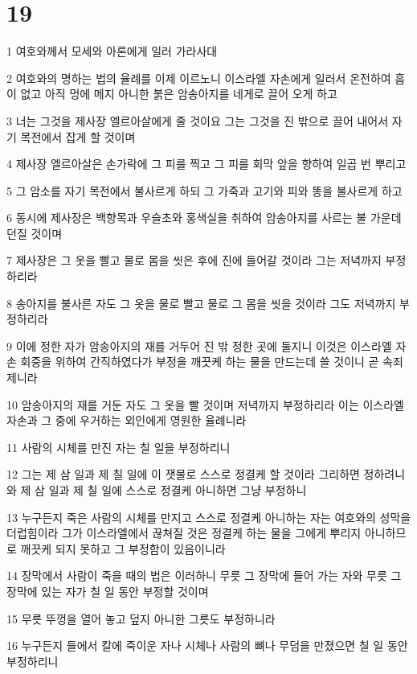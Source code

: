 \chapter{19}

\par 1 여호와께서 모세와 아론에게 일러 가라사대
\par 2 여호와의 명하는 법의 율례를 이제 이르노니 이스라엘 자손에게 일러서 온전하여 흠이 없고 아직 멍에 메지 아니한 붉은 암송아지를 네게로 끌어 오게 하고
\par 3 너는 그것을 제사장 엘르아살에게 줄 것이요 그는 그것을 진 밖으로 끌어 내어서 자기 목전에서 잡게 할 것이며
\par 4 제사장 엘르아살은 손가락에 그 피를 찍고 그 피를 회막 앞을 향하여 일곱 번 뿌리고
\par 5 그 암소를 자기 목전에서 불사르게 하되 그 가죽과 고기와 피와 똥을 불사르게 하고
\par 6 동시에 제사장은 백향목과 우슬초와 홍색실을 취하여 암송아지를 사르는 불 가운데 던질 것이며
\par 7 제사장은 그 옷을 빨고 물로 몸을 씻은 후에 진에 들어갈 것이라 그는 저녁까지 부정하리라
\par 8 송아지를 불사른 자도 그 옷을 물로 빨고 물로 그 몸을 씻을 것이라 그도 저녁까지 부정하리라
\par 9 이에 정한 자가 암송아지의 재를 거두어 진 밖 정한 곳에 둘지니 이것은 이스라엘 자손 회중을 위하여 간직하였다가 부정을 깨끗케 하는 물을 만드는데 쓸 것이니 곧 속죄제니라
\par 10 암송아지의 재를 거둔 자도 그 옷을 빨 것이며 저녁까지 부정하리라 이는 이스라엘 자손과 그 중에 우거하는 외인에게 영원한 율례니라
\par 11 사람의 시체를 만진 자는 칠 일을 부정하리니
\par 12 그는 제 삼 일과 제 칠 일에 이 잿물로 스스로 정결케 할 것이라 그리하면 정하려니와 제 삼 일과 제 칠 일에 스스로 정결케 아니하면 그냥 부정하니
\par 13 누구든지 죽은 사람의 시체를 만지고 스스로 정결케 아니하는 자는 여호와의 성막을 더럽힘이라 그가 이스라엘에서 끊쳐질 것은 정결케 하는 물을 그에게 뿌리지 아니하므로 깨끗케 되지 못하고 그 부정함이 있음이니라
\par 14 장막에서 사람이 죽을 때의 법은 이러하니 무릇 그 장막에 들어 가는 자와 무릇 그 장막에 있는 자가 칠 일 동안 부정할 것이며
\par 15 무릇 뚜껑을 열어 놓고 덮지 아니한 그릇도 부정하니라
\par 16 누구든지 들에서 칼에 죽이운 자나 시체나 사람의 뼈나 무덤을 만졌으면 칠 일 동안 부정하리니
